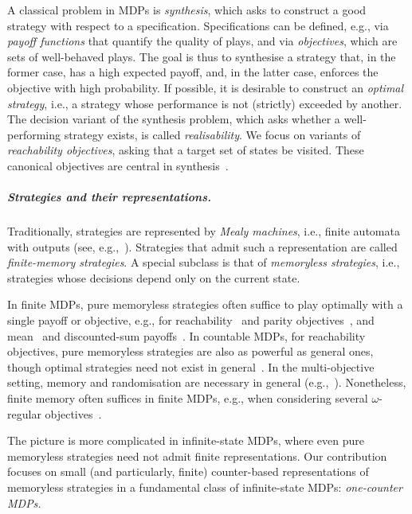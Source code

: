 \documentclass[a4paper,UKenglish,cleveref,autoref,thm-restate,colorlinks]{lipics-v2021}
\begin{document}
A classical problem in MDPs is \textit{synthesis}, which asks to construct a good strategy with respect to a specification.
Specifications can be defined, e.g., via \textit{payoff functions} that quantify the quality of plays, and via \textit{objectives}, which are sets of well-behaved plays.
The goal is thus to synthesise a strategy that, in the former case, has a high expected payoff, and, in the latter case, enforces the objective with high probability.
If possible, it is desirable to construct an \textit{optimal strategy}, i.e., a strategy whose performance is not (strictly) exceeded by another.
The decision variant of the synthesis problem, which asks whether a well-performing strategy exists, is called \textit{realisability}.
We focus on variants of \textit{reachability objectives}, asking that a target set of states be visited. These canonical objectives are central in synthesis~\cite{DBLP:conf/fsttcs/BrihayeGMR23}.

\subparagraph*{Strategies and their representations.}
Traditionally, strategies are represented by \textit{Mealy machines}, i.e., finite automata with outputs (see, e.g.,~\cite{DBLP:journals/lmcs/BouyerRORV22,DBLP:journals/iandc/MainR24}).
Strategies that admit such a representation are called \textit{finite-memory strategies}.
A special subclass is that of \textit{memoryless strategies}, i.e., strategies whose decisions depend only on the current state.

In finite MDPs, pure memoryless strategies often suffice to play optimally with a single payoff or objective, e.g., for reachability~\cite{BK08} and parity objectives~\cite{DBLP:conf/soda/ChatterjeeJH04}, and mean~\cite{bierth1987expected} and discounted-sum payoffs~\cite{Sha53}.
In countable MDPs, for reachability objectives, pure memoryless strategies are also as powerful as general ones, though optimal strategies need not exist in general~\cite{Orn69,DBLP:conf/icalp/KieferMSTW20}.
In the multi-objective setting, memory and randomisation are necessary in general (e.g.,~\cite{DBLP:journals/fmsd/RandourRS17,DBLP:conf/fsttcs/BrihayeGMR23}).
Nonetheless, finite memory often suffices in finite MDPs, e.g., when considering several $\omega$-regular objectives~\cite{DBLP:journals/lmcs/EtessamiKVY08}.

The picture is more complicated in infinite-state MDPs, where even pure memoryless strategies need not admit finite representations.
Our contribution focuses on small (and particularly, finite) counter-based representations of memoryless strategies in a fundamental class of infinite-state MDPs: \emph{one-counter MDPs.}
\end{document}
